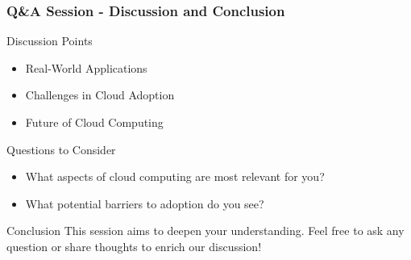 \documentclass[aspectratio=169]{beamer}
\begin{document}
\begin{frame}[fragile]
    \frametitle{Q\&A Session - Discussion and Conclusion}
    \begin{block}{Discussion Points}
        \begin{itemize}
            \item Real-World Applications
            \item Challenges in Cloud Adoption
            \item Future of Cloud Computing
        \end{itemize}
    \end{block}

    \begin{block}{Questions to Consider}
        \begin{itemize}
            \item What aspects of cloud computing are most relevant for you?
            \item What potential barriers to adoption do you see?
        \end{itemize}
    \end{block}

    \begin{block}{Conclusion}
        This session aims to deepen your understanding. Feel free to ask any question or share thoughts to enrich our discussion!
    \end{block}
\end{frame}
\end{document}

